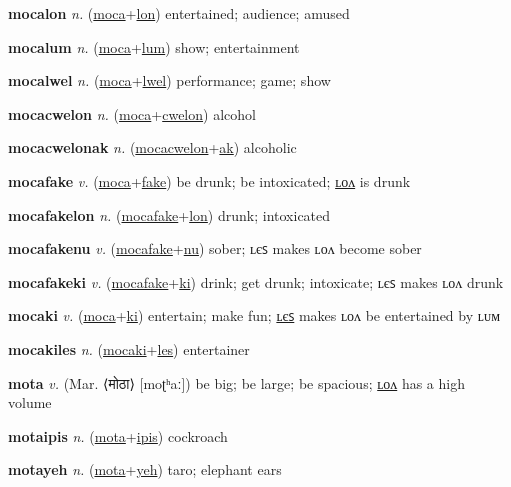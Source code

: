 \textbf{\hypertarget{mocalon}{mocalon}} \textit{n.} (\hyperlink{moca}{moca}+\allowbreak \hyperlink{lon}{lon})
entertained; audience; amused

\textbf{\hypertarget{mocalum}{mocalum}} \textit{n.} (\hyperlink{moca}{moca}+\allowbreak \hyperlink{lum}{lum})
show; entertainment

\textbf{\hypertarget{mocalwel}{mocalwel}} \textit{n.} (\hyperlink{moca}{moca}+\allowbreak \hyperlink{lwel}{lwel})
performance; game; show

\textbf{\hypertarget{mocacwelon}{mocacwelon}} \textit{n.} (\hyperlink{moca}{moca}+\allowbreak \hyperlink{cwelon}{cwelon})
alcohol

\textbf{\hypertarget{mocacwelonak}{mocacwelonak}} \textit{n.} (\hyperlink{mocacwelon}{mocacwelon}+\allowbreak \hyperlink{ak}{ak})
alcoholic

\textbf{\hypertarget{mocafake}{mocafake}} \textit{v.} (\hyperlink{moca}{moca}+\allowbreak \hyperlink{fake}{fake})
be drunk; be intoxicated; \hyperlink{mocafakelon}{ʟᴏᴧ} is drunk

\textbf{\hypertarget{mocafakelon}{mocafakelon}} \textit{n.} (\hyperlink{mocafake}{mocafake}+\allowbreak \hyperlink{lon}{lon})
drunk; intoxicated

\textbf{\hypertarget{mocafakenu}{mocafakenu}} \textit{v.} (\hyperlink{mocafake}{mocafake}+\allowbreak \hyperlink{nu}{nu})
sober; ʟєꜱ makes ʟᴏᴧ become sober

\textbf{\hypertarget{mocafakeki}{mocafakeki}} \textit{v.} (\hyperlink{mocafake}{mocafake}+\allowbreak \hyperlink{ki}{ki})
drink; get drunk; intoxicate; ʟєꜱ makes ʟᴏᴧ drunk

\textbf{\hypertarget{mocaki}{mocaki}} \textit{v.} (\hyperlink{moca}{moca}+\allowbreak \hyperlink{ki}{ki})
entertain; make fun; \hyperlink{mocakiles}{ʟєꜱ} makes ʟᴏᴧ be entertained by ʟᴜᴍ

\textbf{\hypertarget{mocakiles}{mocakiles}} \textit{n.} (\hyperlink{mocaki}{mocaki}+\allowbreak \hyperlink{les}{les})
entertainer

\textbf{\hypertarget{mota}{mota}} \textit{v.} (Mar. ⟨{\devanagari{}मोठा}⟩ [moʈʰaː])
be big; be large; be spacious; \hyperlink{motalon}{ʟᴏᴧ} has a high volume

\textbf{\hypertarget{motaipis}{motaipis}} \textit{n.} (\hyperlink{mota}{mota}+\allowbreak \hyperlink{ipis}{ipis})
cockroach

\textbf{\hypertarget{motayeh}{motayeh}} \textit{n.} (\hyperlink{mota}{mota}+\allowbreak \hyperlink{yeh}{yeh})
taro; elephant ears


